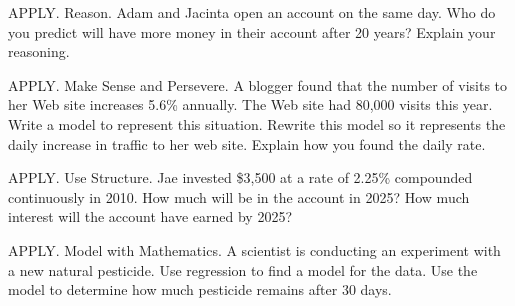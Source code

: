 \documentclass{article}
\newenvironment{practice}[2]{}{}        %
\newcommand{\answer}[1]{}               %
\newcommand{\placeholder}[2]{}          %
\newcommand{\te}[1]{}                   %
\begin{document}
\begin{practice}{27}{3}
APPLY. Reason. Adam and Jacinta open an account on the same day. Who do you predict will have more money in their account after 20 years? Explain your reasoning.
\placeholder{diagram}{Two horizontal money-growth arrows: Adam, green, starts with a bill labeled \$8,000, arrow reads Interest compounded quarterly at1.25\%, 20years below, ending at a stack of bills labeled ?. Jacinta, magenta, same \$8,000, arrow Interest compounded continuously at1.25\%, 20years, ending at bills labeled ?.}
\answer{Jacinta; Continuously compounded interest increases at a faster rate.}
\end{practice}
\begin{practice}{28}{2}
APPLY. Make Sense and Persevere. A blogger found that the number of visits to her Web site increases 5.6\% annually. The Web site had 80,000 visits this year. Write a model to represent this situation. Rewrite this model so it represents the daily increase in traffic to her web site. Explain how you found the daily rate.
\answer{(y=80,000(1.000149)^{365t}); 0.0149\%; Multiply the exponent by 365 so that the model compounds daily, then calculate ((1.056)^{\frac1{365}}-1) to find the daily rate.}
\te{Printed ``multiply the exponent by 365'' omits division by 365 in the equivalent base transformation; likely multiply by (365/365).}
\end{practice}
\begin{practice}{29}{2}
APPLY. Use Structure. Jae invested \$3,500 at a rate of 2.25\% compounded continuously in 2010. How much will be in the account in 2025? How much interest will the account have earned by 2025?
\answer{\$4,905.04; \$1,405.04}
\end{practice}
\begin{practice}{30}{2}
APPLY. Model with Mathematics. A scientist is conducting an experiment with a new natural pesticide. Use regression to find a model for the data. Use the model to determine how much pesticide remains after 30 days.
\placeholder{diagram}{Green circles representing pesticide shrink in seven rows over a brown insect lying on its back. Dotted horizontal guides read Day0 20.00g; Day1 14.73g; Day2 11.29g; Day3 8.38g; Day4 6.82g; Day5 4.75g; Day6 3.15g.}
\answer{(y=20.361(0.743)^x); 0.0027 grams}
\end{practice}
\end{document}
